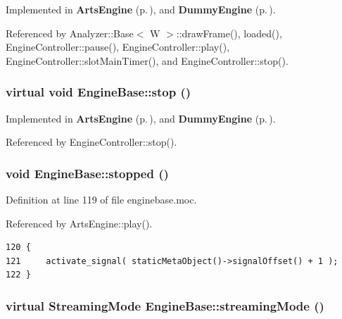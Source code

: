 Implemented in {\bf Arts\-Engine} {\rm (p.\,\pageref{classArtsEngine_ArtsEnginea7})}, and {\bf Dummy\-Engine} {\rm (p.\,\pageref{classDummyEngine_DummyEngined5})}.

Referenced by Analyzer::Base$<$ W $>$::draw\-Frame(), loaded(), Engine\-Controller::pause(), Engine\-Controller::play(), Engine\-Controller::slot\-Main\-Timer(), and Engine\-Controller::stop().
\subsubsection{\setlength{\rightskip}{0pt plus 5cm}virtual void Engine\-Base::stop ()\hspace{0.3cm}{\tt  [pure virtual, slot]}}\label{classEngineBase_EngineBasei2}




Implemented in {\bf Arts\-Engine} {\rm (p.\,\pageref{classArtsEngine_ArtsEnginei2})}, and {\bf Dummy\-Engine} {\rm (p.\,\pageref{classDummyEngine_DummyEngined9})}.

Referenced by Engine\-Controller::stop().
\subsubsection{\setlength{\rightskip}{0pt plus 5cm}void Engine\-Base::stopped ()\hspace{0.3cm}{\tt  [signal]}}\label{classEngineBase_EngineBasel1}




Definition at line 119 of file enginebase.moc.

Referenced by Arts\-Engine::play().



\footnotesize\begin{verbatim}120 {
121     activate_signal( staticMetaObject()->signalOffset() + 1 );
122 }
\end{verbatim}\normalsize 
{}
\subsubsection{\setlength{\rightskip}{0pt plus 5cm}virtual {\bf Streaming\-Mode} Engine\-Base::streaming\-Mode ()\hspace{0.3cm}{\tt  [inline, virtual]}}\label{classEngineBase_EngineBasea5}




